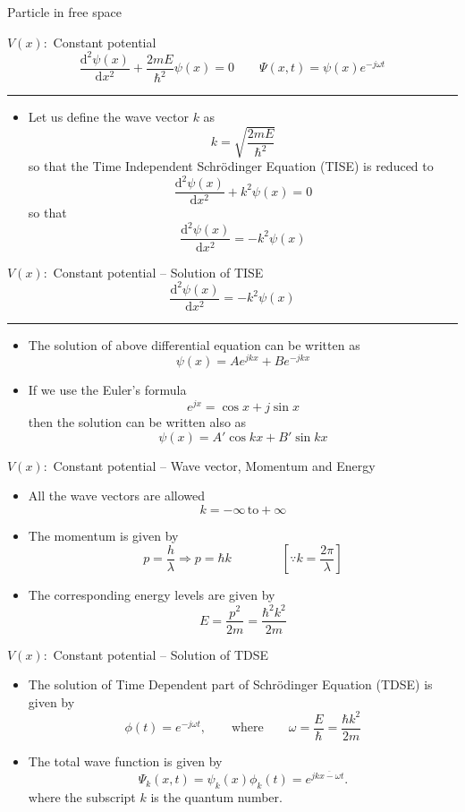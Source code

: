 %
\begin{frame}
	\begin{huge}
		\begin{center}
			Particle in free space
		\end{center}
	\end{huge}
\end{frame}
%
\begin{frame}{\(V(x) :\) Constant potential }
	\[
	\frac{\mathrm{d}^2 \psi(x)}{\mathrm{d} x^2}
	+
	\frac{2mE}{\hbar^2} \psi(x)
	=
	0
	\qquad
	\Psi(x, t) = \psi(x) e^{-j \omega t}
	\]
	\hrule
	\begin{itemize}
		\item Let us define the wave vector \(k\) as
		\[
		k = \sqrt{\frac{2mE}{\hbar^2}}
		\]
		so that the Time Independent Schr\"odinger Equation (TISE) is reduced to 
		\[
		\frac{\mathrm{d}^2 \psi(x)}{\mathrm{d} x^2}
		+
		k^2 \psi(x)
		=
		0
		\]
		so that
		\[
		\frac{\mathrm{d}^2 \psi(x)}{\mathrm{d} x^2}  = - k^2 \psi(x)
		\]
	\end{itemize}
\end{frame}
%
\begin{frame}{\(V(x) :\) Constant potential -- Solution of TISE}
	\[
	\frac{\mathrm{d}^2 \psi(x)}{\mathrm{d} x^2}  = - k^2 \psi(x)
	\]
	\hrule
	\begin{itemize}
		\item The solution of above differential equation can be written as
		\[
		\psi(x)  = A e^{j k x} + B e^{-j k x}
		\]
		\item If we use the Euler's formula
		\[
		e^{j x} = \cos x + j \sin x 
		\]
		then the solution can be written also as
		\[
		\psi(x)  = A' \cos k x + B' \sin k x
		\]
	\end{itemize}
\end{frame}
%
\begin{frame}{\(V(x) :\) Constant potential -- Wave vector, Momentum and Energy}
	\begin{itemize}
		\item All the wave vectors are allowed
		\[
		k = -\infty \, \text{to} +\infty
		\]
		\item The momentum is given by
		\[
		p = \frac{h}{\lambda} \Rightarrow p = \hbar k \qquad \qquad[\because k = \frac{2\pi}{\lambda}]
		\]
		\item The corresponding energy levels are given by
		\[
		E = \frac{p^2}{2m} = \frac{\hbar^2 k^2}{2m}
		\]
	\end{itemize}
\end{frame}
%
\begin{frame}{\(V(x) :\) Constant potential -- Solution of TDSE}
	\begin{itemize}
		\item The solution of Time Dependent part of Schr\"odinger Equation (TDSE) is given by
		\[
		\phi(t) = e^{-j \omega t}, \qquad \text{where} \qquad \omega = \frac{E}{\hbar} = \frac{\hbar k^2}{2 m}
		\]
		\item The total wave function is given by
		\[
		\Psi_k(x, t) = \psi_k(x)\phi_k(t) = e^{j\overline{k x - \omega t}}.
		\]
		where the subscript \(k\) is the quantum number.
	\end{itemize}
\end{frame}
